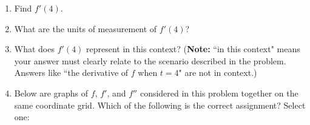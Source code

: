 \documentclass[10pt]{article}
\begin{document}
\begin{enumerate}


\item[(a)] Find $f'(4)$. 

\vfill
\vfill

\item[(b)] What are the units of measurement of $f'(4)$? 

\item[(c)] What does $f'(4)$ represent in this context? ({\bf Note:} ``in this context" means your answer must clearly relate to the scenario described in the problem. Answers like ``the derivative of $f$ when $t=4$" are not in context.)

\vfill

\item[(d)] Below are graphs of $f$, $f'$, and $f''$ considered in this problem together on the same coordinate grid. Which of the following is the correct assignment? Select one:\\

\begin{minipage}[t][3.25in][t]{.3\textwidth}
\end{minipage}
%
\hfill
%
\begin{minipage}[t][3.25in][t]{.68\textwidth}
\,


\end{minipage}
\end{enumerate}
\end{document}
